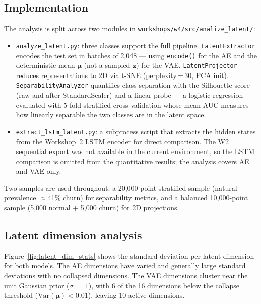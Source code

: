 \documentclass{article}
\begin{document}
\subsection{Implementation}

The analysis is split across two modules in
\texttt{workshops/w4/src/analize\_latent/}:

\begin{itemize}

\item \texttt{analyze\_latent.py}: three classes support the full pipeline.
\texttt{LatentExtractor} encodes the test set in batches of 2{,}048 --- using
\texttt{encode()} for the AE and the deterministic mean $\boldsymbol{\mu}$ (not a
sampled $\mathbf{z}$) for the VAE. \texttt{LatentProjector} reduces representations
to 2D via t-SNE (perplexity\,=\,30, PCA init).
\texttt{SeparabilityAnalyzer} quantifies
class separation with the Silhouette score (raw and after StandardScaler) and a
linear probe --- a logistic regression evaluated with 5-fold stratified cross-validation
whose mean AUC measures how linearly separable the two classes are in the latent space.

\item \texttt{extract\_lstm\_latent.py}: a subprocess script that extracts the hidden
states from the Workshop~2 LSTM encoder for direct comparison. The W2 sequential
export was not available in the current environment, so the LSTM comparison is omitted
from the quantitative results; the analysis covers AE and VAE only.

\end{itemize}

Two samples are used throughout: a 20{,}000-point stratified sample (natural prevalence
$\approx$41\% churn) for separability metrics, and a balanced 10{,}000-point sample
(5{,}000 normal + 5{,}000 churn) for 2D projections.

\subsection{Latent dimension analysis}

Figure~\ref{fig:latent_dim_stats} shows the standard deviation per latent dimension
for both models. The AE dimensions have varied and generally large standard deviations
with no collapsed dimensions. The VAE dimensions cluster near the unit Gaussian prior
($\sigma\,=\,1$), with 6 of the 16 dimensions below the collapse threshold
($\text{Var}(\boldsymbol{\mu}) < 0.01$), leaving 10 active dimensions.
\end{document}
